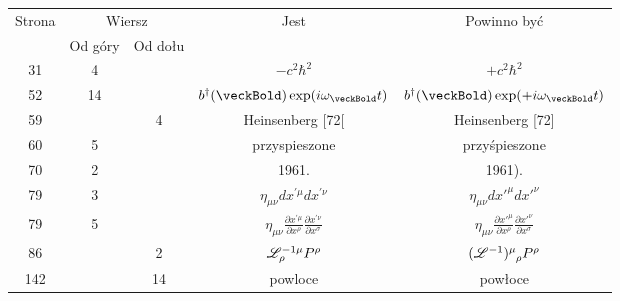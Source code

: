 \documentclass[a4paper,11pt]{article}
\numberwithin{equation}{section}
\begin{document}
\begin{center}

  \begin{tabular}{|c|c|c|c|c|}
    \hline
    Strona & \multicolumn{2}{c|}{Wiersz} & Jest
                              & Powinno być \\ \cline{2-3}
    & Od góry & Od dołu & & \\
    \hline
    31 & 4 & & $-c^{ 2 } \hbar^{ 2 }$ & $+c^{ 2 } \hbar^{ 2 }$ \\
    52 & 14 & & $b^{ \dagger }( \veckBold ) \exp( i \omega_{ \veckBold } t )$
           & $b^{ \dagger }( \veckBold ) \exp( +i \omega_{ \veckBold } t )$ \\
    59 & & 4 & Heinsenberg [72[ & Heinsenberg [72] \\ %
    60 & 5 & & przyspieszone & przyśpieszone \\
    70 & 2 & & 1961. & 1961). \\
    79 & 3 & & $\eta_{ \mu \nu } dx^{ ' \mu } dx^{ ' \nu }$
           & $\eta_{ \mu \nu } dx'^{ \mu } dx'^{ \nu }$ \\
    79 & 5 & & $\eta_{ \mu \nu } \frac{ \partial x^{ ' \mu } }{ \partial x^{ \rho } }
               \frac{ \partial x^{ ' \nu } }{ \partial x^{ \sigma } }$
           & $\eta_{ \mu \nu } \frac{ \partial x'^{ \mu } }{ \partial x^{ \rho } }
             \frac{ \partial x'^{ \nu } }{ \partial x^{ \sigma } }$ \\
    86 & & 2 & $\mathcal{L}_{ \rho }^{ -1 \mu } P^{ \rho }$
           & $\tensor[]{ ( \Lcal^{ -1 } ) }{ ^{ \mu }_{ \rho } } P^{ \rho }$ \\
    142 & & 14 & powloce & powłoce \\
    \hline
  \end{tabular}






\end{center}
\end{document}
